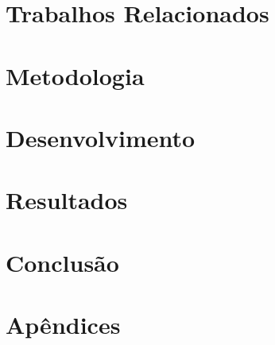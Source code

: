 \documentclass[12pt,openright,twoside,a4paper]{abntex2}
\begin{document}
\chapter{Trabalhos Relacionados}
\lipsum[4]

\chapter{Metodologia}
\lipsum[5]

\chapter{Desenvolvimento}
\lipsum[6]

\chapter{Resultados}
\lipsum[7]

\chapter{Conclusão}
\lipsum[8]



\appendix
\chapter{Apêndices}
\lipsum[9]
\end{document}

